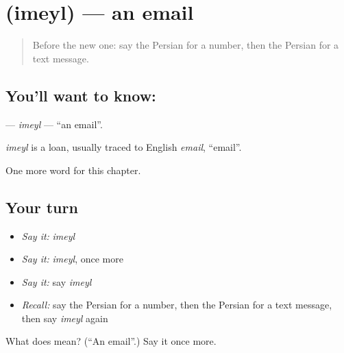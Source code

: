 \section[\texorpdfstring{\fa{ایمیل} (imeyl)}{ایمیل (imeyl)}]{ (imeyl) — an email}

\label{lesson:FA-C276-imeyl}



\begin{quote}
Before the new one: say the Persian for a number, then the Persian for a text message.
\end{quote}

\subsection*{You'll want to know: }
\textbf{} — \emph{imeyl} — \textquotedblleft{}an email\textquotedblright{}.

\begin{cousinweb}
\emph{imeyl} is a loan, usually traced to English \emph{email}, \textquotedblleft{}email\textquotedblright{}.
\end{cousinweb}

\begin{grammarlens}[title={What you've built}]
One more word for this chapter.
\end{grammarlens}

\subsection*{Your turn}
\begin{itemize}
\raggedright
  \item \emph{Say it:} \emph{imeyl}
  \item \emph{Say it:} \emph{imeyl}, once more
  \item \emph{Say it:} say \emph{imeyl}
  \item \emph{Recall:} say the Persian for a number, then the Persian for a text message, then say \emph{imeyl} again
\end{itemize}

\begin{tcolorbox}[breakable,colback=teal!4,colframe=teal!35!black,title={Before you move on}]
What does  mean? (\textquotedblleft{}An email\textquotedblright{}.) Say it once more.
\end{tcolorbox}
